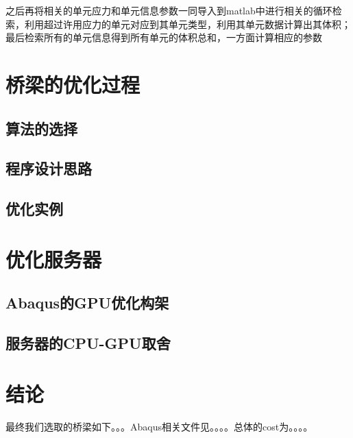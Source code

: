 \documentclass[forprint]{WHUBachelor}
\begin{document}
之后再将相关的单元应力和单元信息参数一同导入到matlab中进行相关的循环检索，利用超过许用应力的单元对应到其单元类型，利用其单元数据计算出其体积；最后检索所有的单元信息得到所有单元的体积总和，一方面计算相应的参数


\chapter{桥梁的优化过程}
\section{算法的选择}
\section{程序设计思路}
\section{优化实例}
\chapter{优化服务器}
\section{Abaqus的GPU优化构架}
\section{服务器的CPU-GPU取舍}
\chapter{结论}
最终我们选取的桥梁如下。。。Abaqus相关文件见。。。。总体的cost为。。。。


\cleardoublepage
\end{document}

